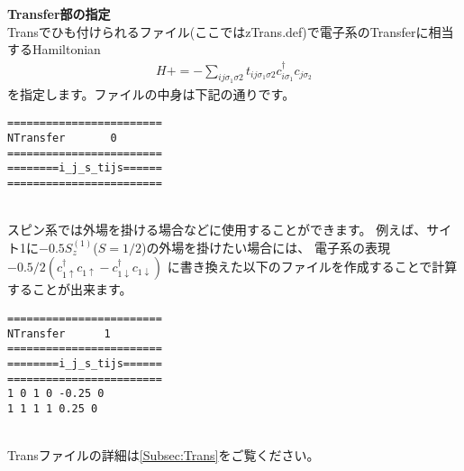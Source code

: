 \begin{description}
\item {\bf Transfer部の指定}\\
Transでひも付けられるファイル(ここではzTrans.def)で電子系のTransferに相当するHamiltonian
\begin{align}
H +=-\sum_{ij\sigma_1\sigma2} t_{ij\sigma_1\sigma2}c_{i\sigma_1}^{\dag}c_{j\sigma_2}
\end{align}
を指定します。ファイルの中身は下記の通りです。\\
\begin{minipage}{15cm}
\begin{screen}
\begin{verbatim}
======================== 
NTransfer       0  
======================== 
========i_j_s_tijs====== 
======================== 
\end{verbatim}
\end{screen}
\end{minipage}
~\\
スピン系では外場を掛ける場合などに使用することができます。
例えば、サイト1に$-0.5 S_z^{(1)}${($S=1/2$)}の外場を掛けたい場合には、
電子系の表現$-0.5/2(c_{1\uparrow}^{\dag}c_{1\uparrow}-c_{1\downarrow}^{\dag}c_{1\downarrow})$
に書き換えた以下のファイルを作成することで計算することが出来ます。\\
\begin{minipage}{15cm}
\begin{screen}
\begin{verbatim}
======================== 
NTransfer      1   
======================== 
========i_j_s_tijs====== 
======================== 
1 0 1 0 -0.25 0
1 1 1 1 0.25 0
\end{verbatim}
\end{screen}
\end{minipage}
~\\
Transファイルの詳細は\ref{Subsec:Trans}をご覧ください。


\end{description}
